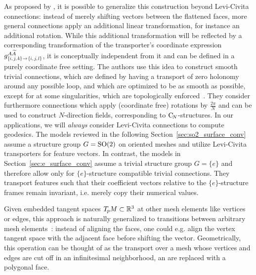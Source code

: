 As proposed by \citet{craneTrivialConnectionsDiscrete2010}, it is possible to generalize this construction beyond Levi-Civita connections:
instead of merely shifting vectors between the flattened faces, more general connections apply an additional linear transformation, for instance an additional rotation.
While this additional transformation will be reflected by a corresponding transformation of the transporter's coordinate expression
$g^{A\widetilde{A}}_{\protect\scalebox{.68}{$\{i,j,k\mkern-1mu\}\!\to\!\{i,j,l\}$}}$,
it is conceptually independent from it and can be defined in a purely coordinate free setting.
The authors use this idea to construct smooth trivial connections, which are defined by having a transport of zero holonomy around any possible loop, and which are optimized to be as smooth as possible, except for at some singularities, which are topologically enforced~\cite{craneTrivialConnectionsDiscrete2010}.
They consider furthermore connections which apply (coordinate free) rotations by $\frac{2\pi}{N}$ and can be used to construct $N$-direction fields, corresponding to $\operatorname{C}_{\!N}$-structures.
In our applications, we will \emph{always} consider Levi-Civita connections to compute geodesics.
The models reviewed in the following Section~\ref{sec:so2_surface_conv} assume a structure group $G=\operatorname{SO}(2)$ on oriented meshes and utilize Levi-Civita transporters for feature vectors.
In contrast, the models in Section~\ref{sec:e_surface_conv} assume a trivial structure group $G=\{e\}$ and therefore allow only for $\{e\}$-structure compatible trivial connections.
They transport features such that their coefficient vectors relative to the $\{e\}$-structure frames remain invariant, i.e. merely copy their numerical values.


Given embedded tangent spaces $T_{\mkern-1.5mu p}\mkern-.5muM \subset \mathbb{R}^3$ at other mesh elements like vertices or edges, this approach is naturally generalized to transitions between arbitrary mesh elements~\cite{deHaan2020meshCNNs}:
instead of aligning the faces, one could e.g. align the vertex tangent space with the adjacent face before shifting the vector.
Geometrically, this operation can be thought of as the transport over a mesh whose vertices and edges are cut off in an infinitesimal neighborhood, an are replaced with a polygonal face.


